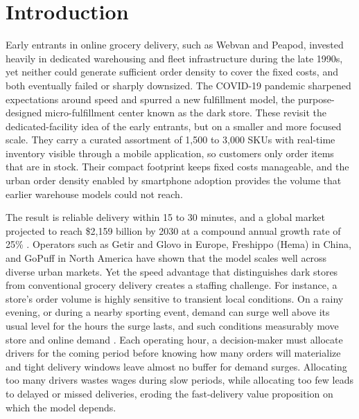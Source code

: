 \documentclass[preprint,11pt,authoryear]{elsarticle}
\theoremstyle{remark}
\begin{document}
\section{Introduction}

Early entrants in online grocery delivery, such as Webvan and Peapod, invested heavily in dedicated warehousing and fleet infrastructure during the late 1990s, yet neither could generate sufficient order density to cover the fixed costs, and both eventually failed or sharply downsized. The COVID-19 pandemic sharpened expectations around speed and spurred a new fulfillment model, the purpose-designed micro-fulfillment center known as the dark store. These revisit the dedicated-facility idea of the early entrants, but on a smaller and more focused scale. They carry a curated assortment of 1,500 to 3,000 SKUs with real-time inventory visible through a mobile application, so customers only order items that are in stock. Their compact footprint keeps fixed costs manageable, and the urban order density enabled by smartphone adoption provides the volume that earlier warehouse models could not reach. 

The result is reliable delivery within 15 to 30 minutes, and a global market projected to reach \$2,159 billion by 2030 at a compound annual growth rate of 25\% \citep{globenewswire2022}. Operators such as Getir and Glovo in Europe, Freshippo (Hema) in China, and GoPuff in North America have shown that the model scales well across diverse urban markets. Yet the speed advantage that distinguishes dark stores from conventional grocery delivery creates a staffing challenge. For instance, a store's order volume is highly sensitive to transient local conditions. On a rainy evening, or during a nearby sporting event, demand can surge well above its usual level for the hours the surge lasts, and such conditions measurably move store and online demand \citep{SteinkerHobergThonemann2017, BadorfHoberg2020}. Each operating hour, a decision-maker must allocate drivers for the coming period before knowing how many orders will materialize and tight delivery windows leave almost no buffer for demand surges. Allocating too many drivers wastes wages during slow periods, while allocating too few leads to delayed or missed deliveries, eroding the fast-delivery value proposition on which the model depends.
\end{document}
